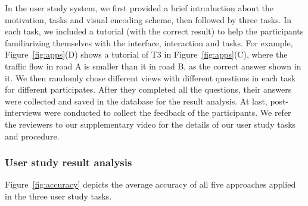 In the user study system, we first provided a brief introduction about the motivation, tasks and visual encoding scheme, then followed by three tasks.
In each task, we included a tutorial (with the correct result) to help the participants familiarizing themselves with the interface, interaction and tasks.
For example, Figure~\ref{fig:apps}(D) shows a tutorial of T3 in Figure~\ref{fig:apps}(C), where the traffic flow in road A is smaller than it in road B, as the correct answer shown in it.
We then randomly chose different views with different questions in each task for different participates.
After they completed all the questions, their answers were collected and saved in the database for the result analysis.
At last, post-interviews were conducted to collect the feedback of the participants.
We refer the reviewers to our supplementary video for the details of our user study tasks and procedure.


\subsubsection{User study result analysis}\label{sec:uret}
Figure~\ref{fig:accuracy} depicts the average accuracy of all five approaches applied in the three user study tasks.



